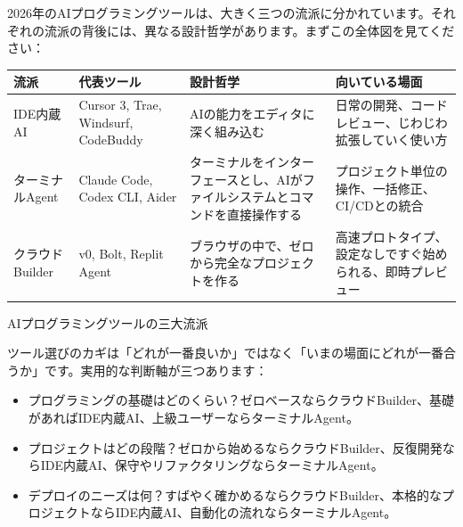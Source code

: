 


2026年のAIプログラミングツールは、大きく三つの流派に分かれています。それぞれの流派の背後には、異なる設計哲学があります。まずこの全体図を見てください：

\begin{center}
\begin{tabularx}{\linewidth}{|X|X|X|X|}
\hline
\textbf{流派} & \textbf{代表ツール} & \textbf{設計哲学} & \textbf{向いている場面} \tabularnewline
\hline
IDE内蔵AI & Cursor 3, Trae, Windsurf, CodeBuddy & AIの能力をエディタに深く組み込む & 日常の開発、コードレビュー、じわじわ拡張していく使い方 \tabularnewline
ターミナルAgent & Claude Code, Codex CLI, Aider & ターミナルをインターフェースとし、AIがファイルシステムとコマンドを直接操作する & プロジェクト単位の操作、一括修正、CI/CDとの統合 \tabularnewline
クラウドBuilder & v0, Bolt, Replit Agent & ブラウザの中で、ゼロから完全なプロジェクトを作る & 高速プロトタイプ、設定なしですぐ始められる、即時プレビュー \tabularnewline
\hline
\end{tabularx}
\end{center}

\begin{center}\small\color{gray}AIプログラミングツールの三大流派\end{center}

ツール選びのカギは「どれが一番良いか」ではなく「いまの場面にどれが一番合うか」です。実用的な判断軸が三つあります：

\begin{itemize}
  \item プログラミングの基礎はどのくらい？ゼロベースならクラウドBuilder、基礎があればIDE内蔵AI、上級ユーザーならターミナルAgent。
  \item プロジェクトはどの段階？ゼロから始めるならクラウドBuilder、反復開発ならIDE内蔵AI、保守やリファクタリングならターミナルAgent。
  \item デプロイのニーズは何？すばやく確かめるならクラウドBuilder、本格的なプロジェクトならIDE内蔵AI、自動化の流れならターミナルAgent。
\end{itemize}

